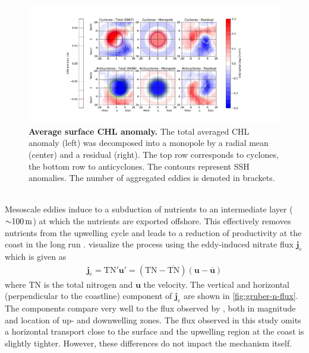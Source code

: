 \begin{figure}
    \centering
    \includegraphics[width=18cm, trim=6.5cm 0 0 0]{../figures/result_composites_chl.pdf}
    \caption[Average surface CHL anomaly]{\textbf{Average surface CHL anomaly.} The total averaged CHL anomaly (left) was decomposed into a monopole by a radial mean (center) and a residual (right). The top row corresponds to cyclones, the bottom row to anticyclones. The contours represent SSH anomalies. The number of aggregated eddies is denoted in brackets.}\label{fig:chl-anomaly}
\end{figure}
\\
Mesoscale eddies induce to a subduction of nutrients to an intermediate layer (${\sim} \SI{100}{\metre}$) at which the nutrients are exported offshore. This effectively removes nutrients from the upwelling cycle and leads to a reduction of productivity at the coast in the long run \autocite{gruber-2011-eddy-red}. \Textcite{gruber-2011-eddy-red} visualize the process using the eddy-induced nitrate flux $\mathbf{j}_e$ which is given as
\begin{align}
\mathbf{j}_e = \text{TN}'\textbf{u}' = (\text{TN} - \overline{\text{TN}})(\textbf{u} - \overline{\textbf{u}})
\end{align}
where TN is the total nitrogen and $\mathbf{u}$ the velocity. The vertical and horizontal (perpendicular to the coastline) component of $\mathbf{j}_e$ are shown in \autoref{fig:gruber-n-flux}. The components compare very well to the flux observed by \textcite[see their Figure 4]{gruber-2011-eddy-red}, both in magnitude and location of up- and downwelling zones. The flux observed in this study omits a horizontal transport close to the surface and the upwelling region at the coast is slightly tighter. However, these differences do not impact the mechanism itself.
